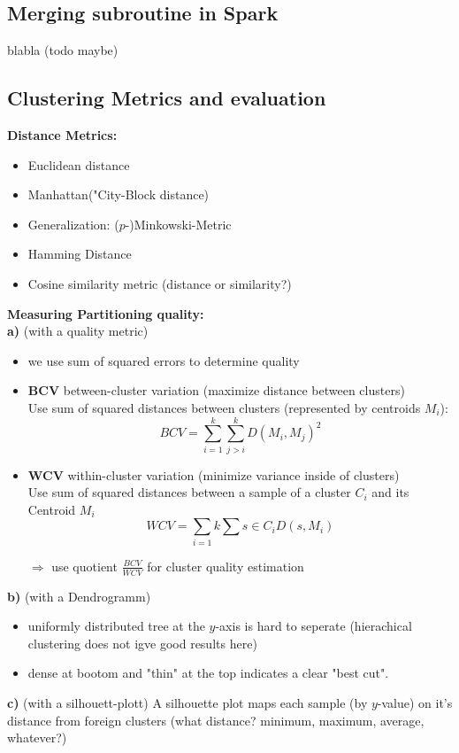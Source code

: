 \documentclass[]{article}
\begin{document}
\subsection{Merging subroutine in Spark}
blabla (todo maybe)

\subsection{Clustering Metrics and evaluation}
\textbf{Distance Metrics:}
\begin{itemize}
\item Euclidean distance
\item Manhattan("City-Block distance)
\item Generalization: ($p$-)Minkowski-Metric
\item Hamming Distance
\item Cosine similarity metric (distance or similarity?)
\end{itemize}
\textbf{Measuring Partitioning quality:}\\
\textbf{a)} (with a quality metric)
\begin{itemize}
\item we use sum of squared errors to determine quality
\item \textbf{BCV} between-cluster variation (maximize distance between clusters) \\
	  Use sum of squared distances between clusters (represented by centroids $M_i$):
	  $$BCV = \sum_{i=1}^{k}\sum_{j>i}^{k}D(M_i,M_j)^2$$
\item \textbf{WCV} within-cluster variation (minimize variance inside of clusters) \\
	  Use sum of squared distances between a sample of a cluster $C_i$ and its Centroid $M_i$ 
	  $$ WCV = \sum_{i=1}{k}\sum{s \in C_i} D(s,M_i) $$ 
\item [$\Rightarrow$] use quotient $\frac{BCV}{WCV}$ for cluster quality estimation
\end{itemize}
\textbf{b)} (with a Dendrogramm)
\begin{itemize}
\item uniformly distributed tree at the $y$-axis is hard to seperate (hierachical clustering does not igve good results here)
\item dense at bootom and "thin" at the top indicates a clear "best cut".
\end{itemize}

\textbf{c)} (with a silhouett-plott)
A silhouette plot maps each sample (by $y$-value) on it's distance from foreign clusters (what distance? minimum, maximum, average, whatever?)
\end{document}
